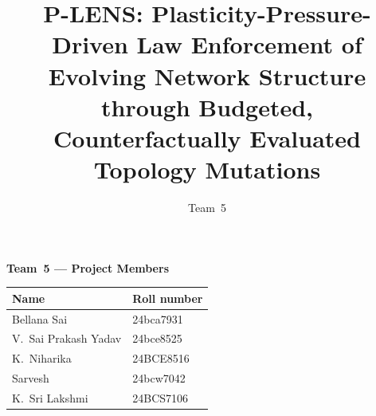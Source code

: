 \documentclass[runningheads]{llncs}
\begin{document}
\title{P-LENS: Plasticity-Pressure-Driven Law Enforcement of\\
Evolving Network Structure through Budgeted,\\
Counterfactually Evaluated Topology Mutations}


\author{Team~5}



\maketitle

\begin{tcolorbox}[enhanced,colback=vitlight,colframe=vitblue,
  boxrule=0.6pt,arc=2.5pt,left=6pt,right=6pt,top=4pt,bottom=5pt]
\centering\small
{\color{vitblue}\textbf{Team~5 --- Project Members}}\\[5pt]
\begin{tabular}{ll}
\toprule
\textbf{Name} & \textbf{Roll number}\\
\midrule
Bellana Sai           & 24bca7931\\
V.~Sai Prakash Yadav  & 24bce8525\\
K.~Niharika           & 24BCE8516\\
Sarvesh               & 24bcw7042\\
K.~Sri Lakshmi        & 24BCS7106\\
\bottomrule
\end{tabular}
\end{tcolorbox}

\clearpage
\end{document}
